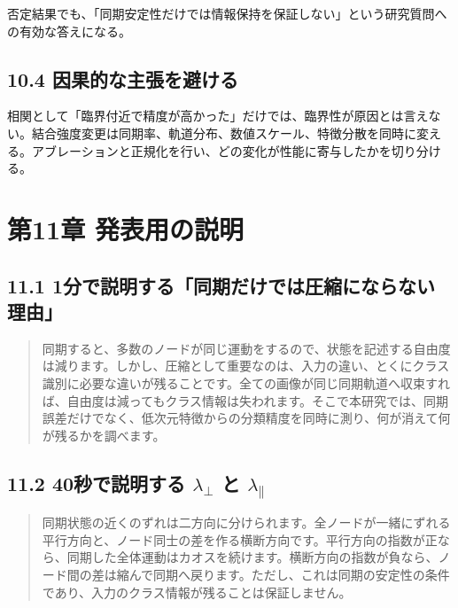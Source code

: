 \documentclass[11pt,a4paper]{ltjsarticle}
\newenvironment{keyquote}{%
  \begin{quote}\color{researchteal}\bfseries\large%
}{%
  \end{quote}%
}
\begin{document}
否定結果でも、「同期安定性だけでは情報保持を保証しない」という研究質問への有効な答えになる。\par

\subsection*{\textcolor{researchblue}{10.4 因果的な主張を避ける}}

相関として「臨界付近で精度が高かった」だけでは、臨界性が原因とは言えない。結合強度変更は同期率、軌道分布、数値スケール、特徴分散を同時に変える。アブレーションと正規化を行い、どの変化が性能に寄与したかを切り分ける。\par

\goodbreak

\section*{\textcolor{researchink}{第11章 発表用の説明}}


\subsection*{\textcolor{researchblue}{11.1 1分で説明する「同期だけでは圧縮にならない理由」}}

\begin{keyquote}

同期すると、多数のノードが同じ運動をするので、状態を記述する自由度は減ります。しかし、圧縮として重要なのは、入力の違い、とくにクラス識別に必要な違いが残ることです。全ての画像が同じ同期軌道へ収束すれば、自由度は減ってもクラス情報は失われます。そこで本研究では、同期誤差だけでなく、低次元特徴からの分類精度を同時に測り、何が消えて何が残るかを調べます。

\end{keyquote}

\subsection*{\textcolor{researchblue}{11.2 40秒で説明する \(\lambda_{\perp}\) と \(\lambda_{\parallel}\)}}

\begin{keyquote}

同期状態の近くのずれは二方向に分けられます。全ノードが一緒にずれる平行方向と、ノード同士の差を作る横断方向です。平行方向の指数が正なら、同期した全体運動はカオスを続けます。横断方向の指数が負なら、ノード間の差は縮んで同期へ戻ります。ただし、これは同期の安定性の条件であり、入力のクラス情報が残ることは保証しません。

\end{keyquote}
\end{document}
